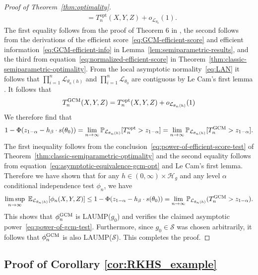 \documentclass[aos]{imsart}
\theoremstyle{plain}
\theoremstyle{remark}
\newcommand{\E}{\mathbb E}								%
\renewcommand{\P}{\mathbb{P}}							%
\newcommand{\srx}{X}									%
\newcommand{\srz}{Z}									%
\newcommand{\sry}{Y}									%
\newcommand{\law}{\mathcal L}							%
\newcommand{\GCM}{\textnormal{GCM}}						%
\renewcommand{\H}{\mathcal H}		 					%
\begin{document}
\begin{proof}[Proof of Theorem~\ref{thm:optimality}]
\begin{equation}
\begin{split}
&= T_n^{\text{opt}}(\srx, \sry, \srz) + o_{\law_{\theta_0}}(1).
\end{split}
\label{eq:asymptotic-equivalence-gcm-opt}
\end{equation}
The first equality follows from the proof of Theorem 6 in \citet{Shah2018}, the second follows from the derivations of the efficient score~\eqref{eq:GCM-efficient-score} and efficient information~\eqref{eq:GCM-efficient-info} in Lemma~\ref{lem:semiparametric-results}, and the third from equation~\eqref{eq:normalized-efficient-score} in Theorem~\ref{thm:classic-semiparametric-optimality}. From the local asymptotic normality~\eqref{eq:LAN} it follows that $\prod_{i=1}^n\law_{\theta_{n}(h)}$ and $\prod_{i=1}^n\law_{\theta_0}$ are contiguous by Le Cam's first lemma \citep[Example 6.5]{VDV1998}. It follows that 
\begin{equation*}
	T^{\GCM}_n(\srx, \sry, \srz) = T_n^{\text{opt}}(\srx, \sry, \srz) + o_{\law_{\theta_{n}(h)}}(1)
\end{equation*}
We therefore find that
\begin{align*}
	1 - \Phi(z_{1-\alpha} - h_\beta \cdot s(\theta_0)) = \lim_{n\rightarrow\infty}\P_{\law_{\theta_{n}(h)}}[T_n^{\text{opt}}>z_{1-\alpha}]=\lim_{n\rightarrow\infty}\P_{\law_{\theta_{n}(h)}}[T_n^{\GCM}>z_{1-\alpha}].
\end{align*}
The first inequality follows from the conclusion~\eqref{eq:power-of-efficient-score-test} of Theorem~\ref{thm:classic-semiparametric-optimality} and the second equality follows from equation~\eqref{eq:asymptotic-equivalence-gcm-opt} and Le Cam's first lemma. Therefore we have shown that for any $h \in (0, \infty) \times \H_g$ and any level $\alpha$ conditional independence test $\phi_n$, we have
\begin{equation*}
\limsup_{n \rightarrow \infty}\ \E_{\law_{\theta_n(h)}}[\phi_n(\srx, \sry, \srz)] \leq 1 - \Phi(z_{1-\alpha} - h_\beta \cdot s(\theta_0)) = \lim_{n\rightarrow\infty}\P_{\law_{\theta_{n}(h)}}(T_n^{\GCM}>z_{1-\alpha}).
\end{equation*}
This shows that $\phi_n^{\GCM}$ is LAUMP($g_0$) and verifies the claimed asymptotic power~\eqref{eq:power-of-gcm-test}. Furthermore, since $g_0 \in \mathcal S$ was chosen arbitrarily, it follows that $\phi_n^{\GCM}$ is also LAUMP($\mathcal S$). This completes the proof.
\end{proof}

\subsection{Proof of Corollary \ref{cor:RKHS_example}} \label{sec:proof-rkhs}
\end{document}
